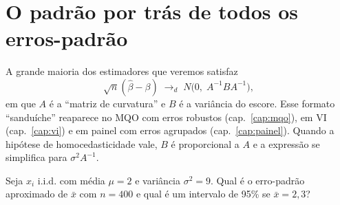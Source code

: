 \section{O padrão por trás de todos os erros-padrão}
A grande maioria dos estimadores que veremos satisfaz
\[
\sqrt n(\hat\beta-\beta)\;\to_d\; N\!\big(0,\;A^{-1}BA^{-1}\big),
\]
em que $A$ é a ``matriz de curvatura'' e $B$ é a variância do escore. Esse formato ``sanduíche'' reaparece no MQO com erros robustos (cap.~\ref{cap:mqo}), em VI (cap.~\ref{cap:vi}) e em painel com erros agrupados (cap.~\ref{cap:painel}). Quando a hipótese de homocedasticidade vale, $B$ é proporcional a $A$ e a expressão se simplifica para $\sigma^2A^{-1}$.

\begin{exercicio}
Seja $x_i$ i.i.d. com média $\mu=2$ e variância $\sigma^2=9$. Qual é o erro-padrão aproximado de $\bar x$ com $n=400$ e qual é um intervalo de 95\% se $\bar x=2{,}3$?
\end{exercicio}
